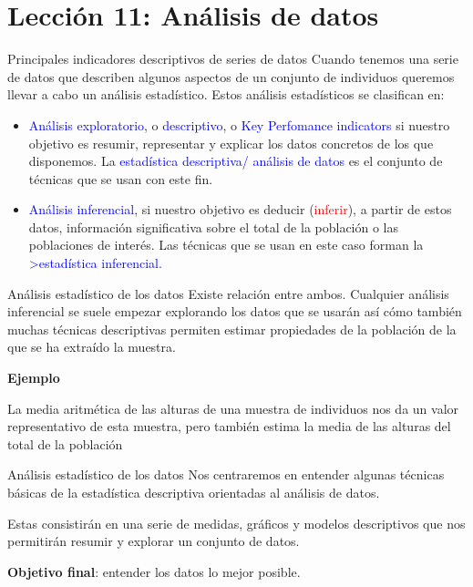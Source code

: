 \documentclass[
  ignorenonframetext,
  aspectratio=169]{beamer}
\newcommand\blue[1]{\textcolor{blue}{#1}}
\newcommand\red[1]{\textcolor{red}{#1}}
\begin{document}
\section{Lección 11: Análisis de
datos}\label{lecciuxf3n-11-anuxe1lisis-de-datos}

\begin{frame}{Principales indicadores descriptivos de series de datos}
\label{principales-indicadores-descriptivos-de-series-de-datos}
Cuando tenemos una serie de datos que describen algunos aspectos de un
conjunto de individuos queremos llevar a cabo un análisis estadístico.
Estos análisis estadísticos se clasifican en:

\begin{itemize}
\item
  \blue{Análisis exploratorio}, o \blue{descriptivo}, o
  \blue{Key Perfomance indicators} si nuestro objetivo es resumir,
  representar y explicar los datos concretos de los que disponemos. La
  \blue{estadística descriptiva/ análisis de datos} es el conjunto de
  técnicas que se usan con este fin.
\item
  \blue{Análisis inferencial}, si nuestro objetivo es deducir
  (\red{inferir}), a partir de estos datos, información significativa
  sobre el total de la población o las poblaciones de interés. Las
  técnicas que se usan en este caso forman la
  \blue{>estadística inferencial.}
\end{itemize}
\end{frame}

\begin{frame}{Análisis estadístico de los datos}
\label{anuxe1lisis-estaduxedstico-de-los-datos}
Existe relación entre ambos. Cualquier análisis inferencial se suele
empezar explorando los datos que se usarán así cómo también muchas
técnicas descriptivas permiten estimar propiedades de la población de la
que se ha extraído la muestra.

\textbf{Ejemplo}

La media aritmética de las alturas de una muestra de individuos nos da
un valor representativo de esta muestra, pero también estima la media de
las alturas del total de la población
\end{frame}

\begin{frame}{Análisis estadístico de los datos}
\label{anuxe1lisis-estaduxedstico-de-los-datos-1}
Nos centraremos en entender algunas técnicas básicas de la estadística
descriptiva orientadas al análisis de datos.

Estas consistirán en una serie de medidas, gráficos y modelos
descriptivos que nos permitirán resumir y explorar un conjunto de datos.

\textbf{Objetivo final}: entender los datos lo mejor posible.
\end{frame}
\end{document}
